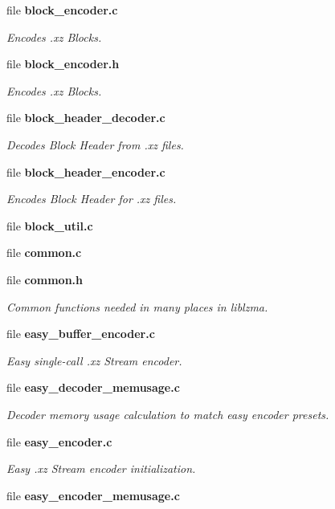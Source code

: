 \begin{DoxyCompactItemize}
file {\bf block\-\_\-encoder.\-c}
\begin{DoxyCompactList}\small\item\em Encodes .xz Blocks. \end{DoxyCompactList}\item 
file {\bf block\-\_\-encoder.\-h}
\begin{DoxyCompactList}\small\item\em Encodes .xz Blocks. \end{DoxyCompactList}\item 
file {\bf block\-\_\-header\-\_\-decoder.\-c}
\begin{DoxyCompactList}\small\item\em Decodes Block Header from .xz files. \end{DoxyCompactList}\item 
file {\bf block\-\_\-header\-\_\-encoder.\-c}
\begin{DoxyCompactList}\small\item\em Encodes Block Header for .xz files. \end{DoxyCompactList}\item 
file {\bfseries block\-\_\-util.\-c}
\item 
file {\bfseries common.\-c}
\item 
file {\bf common.\-h}
\begin{DoxyCompactList}\small\item\em Common functions needed in many places in liblzma. \end{DoxyCompactList}\item 
file {\bf easy\-\_\-buffer\-\_\-encoder.\-c}
\begin{DoxyCompactList}\small\item\em Easy single-\/call .xz Stream encoder. \end{DoxyCompactList}\item 
file {\bf easy\-\_\-decoder\-\_\-memusage.\-c}
\begin{DoxyCompactList}\small\item\em Decoder memory usage calculation to match easy encoder presets. \end{DoxyCompactList}\item 
file {\bf easy\-\_\-encoder.\-c}
\begin{DoxyCompactList}\small\item\em Easy .xz Stream encoder initialization. \end{DoxyCompactList}\item 
file {\bf easy\-\_\-encoder\-\_\-memusage.\-c}

\end{DoxyCompactItemize}
